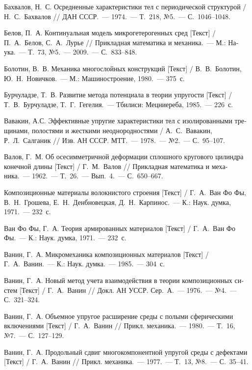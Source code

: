 \begin{russian}
\begin{biblist}{99}
Бахвалов, Н.~С. 
Осредненные характеристики тел с периодической структурой  
/ Н.~С.~Бахвалов 
// ДАН СССР.~--- 1974.~--- Т.~218, №5.~--- С.~1046--1048.

Белов, П.~А. 
Континуальная модель микрогетерогенных сред [Текст] 
/ П.~А.~Белов, С.~А.~Лурье 
// Прикладная математика и механика.~--- М.: Наука.~--- Т.~73, №5.~--- 2009.~--- С.~833--848.

Болотин, В.~В. 
Механика многослойных конструкций [Текст] 
/ В.~В.~Болотин, Ю.~Н.~Новичков.~--- М.: Машиностроение, 1980.~--- 375~с.

Бурчуладзе, Т.~В. 
Развитие метода потенциала в теории упругости [Текст] 
/ Т.~В.~Бурчуладзе, Т.~Г.~Гегелия.~--- Тбилиси: Мецниереба, 1985.~--- 226~с.

Вавакин, А.С. 
Эффективные упругие характеристики тел с изолированными трещинами, полостями и жесткими неоднородностями  
/ А.~С.~Вавакин, Р.~Л.~Салганик 
// Изв. АН СССР. МТТ.~--- 1978.~--- №2.~--- С.~95--107.

Валов, Г.~М. 
Об осесимметричной деформации сплошного кругового цилиндра конечной длины [Текст] 
/ Г.~М.~Валов 
// Прикладная математика и механика.~--- 1962.~--- Т.~26.~--- Вып.~4.~--- С.~650--667.

Композиционные материалы волокнистого строения [Текст] / Г.~А.~Ван Фо Фы, В.~Н.~Грошева, Е.~Н.~Денбновецкая, Д.~Н.~Карпинос.~--- К.: Наук. думка, 1971.~--- 232~с.

Ван Фо Фы, Г.~А. 
Теория армированных материалов [Текст] 
/ Г.~А.~Ван Фо Фы.~--- К.: Наук. думка, 1971.~--- 232~с.

Ванин, Г.~А.
Микромеханика композиционных материалов [Текст] 
/ Г.~А.~Ванин.~--- К.: Наук. думка.~--- 1985.~--- 304~с.

Ванин, Г.~А. 
Новый метод учета взаимодействия в теории композиционных систем [Текст] / Г.~А.~Ванин
// Докл. АН УССР. Сер.~А.~--- 1976.~--- №4.~--- С.~321--324.

Ванин, Г.~А. 
Объемное упругое расширение среды с полыми сферическими включениями [Текст] 
/ Г.~А.~Ванин
// Прикл. механика.~--- 1980.~--- Т.~16, №7.~--- С.~127--129.

Ванин, Г.~А. 
Продольный сдвиг многокомпонентной упругой среды с дефектами [Текст] 
/ Г.~А.~Ванин
// Прикл. механика.~--- 1977.~--- Т.~13, №8.~--- С.~35--41.


\end{biblist}
\end{russian}
